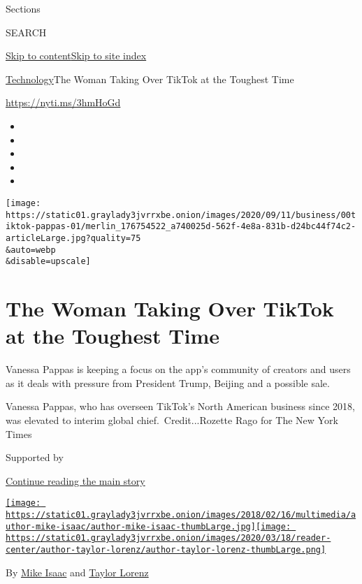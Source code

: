 Sections

SEARCH

\protect\hyperlink{site-content}{Skip to
content}\protect\hyperlink{site-index}{Skip to site index}

\href{/section/technology}{Technology}\textbar{}The Woman Taking Over
TikTok at the Toughest Time

\url{https://nyti.ms/3hmHoGd}

\begin{itemize}
\item
\item
\item
\item
\item
\end{itemize}

\texttt{[image: https://static01.graylady3jvrrxbe.onion/images/2020/09/11/business/00tiktok-pappas-01/merlin\_176754522\_a740025d-562f-4e8a-831b-d24bc44f74c2-articleLarge.jpg?quality=75\\\&auto=webp\\\&disable=upscale]}

\hypertarget{the-woman-taking-over-tiktok-at-the-toughest-time}{%
\section{The Woman Taking Over TikTok at the Toughest
Time}\label{the-woman-taking-over-tiktok-at-the-toughest-time}}

Vanessa Pappas is keeping a focus on the app's community of creators and
users as it deals with pressure from President Trump, Beijing and a
possible sale.

Vanessa Pappas, who has overseen TikTok's North American business since
2018, was elevated to interim global chief.~Credit...Rozette Rago for
The New York Times

Supported by

\protect\hyperlink{after-sponsor}{Continue reading the main story}

\href{https://www.nytimes3xbfgragh.onion/by/mike-isaac}{\texttt{[image: https://static01.graylady3jvrrxbe.onion/images/2018/02/16/multimedia/author-mike-isaac/author-mike-isaac-thumbLarge.jpg]}}\href{https://www.nytimes3xbfgragh.onion/by/taylor-lorenz}{\texttt{[image: https://static01.graylady3jvrrxbe.onion/images/2020/03/18/reader-center/author-taylor-lorenz/author-taylor-lorenz-thumbLarge.png]}}

By \href{https://www.nytimes3xbfgragh.onion/by/mike-isaac}{Mike Isaac}
and \href{https://www.nytimes3xbfgragh.onion/by/taylor-lorenz}{Taylor
Lorenz}

